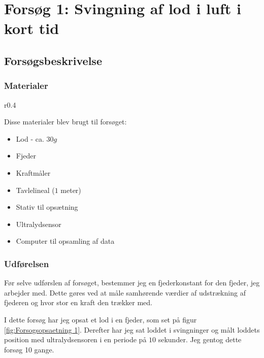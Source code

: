 \section{Forsøg 1: Svingning af lod i luft i kort tid}\label{exp1: Forsog 1 - hele afsnittet}

\subsection{Forsøgsbeskrivelse}\label{exp1: Beskrivelse af experiment}
\subsubsection{Materialer}
\begin{wrapfigure}{r}{0.4\textwidth}
\centering
{}%

\caption{Skitse af forsøgsopsætning til forsøg 1. Den grå figur under loddet er en ultralydsensor.}
\label{fig:Forsogsopsaetning 1}
\end{wrapfigure} 

Disse materialer blev brugt til forsøget:
\begin{itemize}
	\setlength\itemsep{-1em}
	\item Lod - ca. $30g$
	\item Fjeder
	\item Kraftmåler
	\item Tavlelineal ($1$ meter)
	\item Stativ til opsætning
	\item Ultralydsensor
	\item Computer til opsamling af data
\end{itemize}

\subsubsection{Udførelsen}\label{exp1: Udforelse}



Før selve udførslen af forsøget, bestemmer jeg en fjederkonstant for den fjeder, jeg arbejder med. 
Dette gøres ved at måle samhørende værdier af udstrækning af fjederen og hvor stor en kraft den trækker med. 

I dette forsøg har jeg opsat et lod i en fjeder, som set på figur \ref{fig:Forsogsopsaetning 1}.
Derefter har jeg sat loddet i svingninger og målt loddets position med ultralydsensoren i en periode på $10$ sekunder. 
Jeg gentog dette forsøg 10 gange. 


